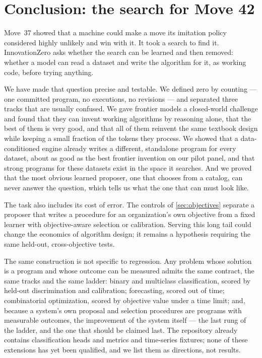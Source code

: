 \section{Conclusion: the search for Move 42}
\label{sec:conclusion}

Move~37 showed that a machine could make a move its imitation policy considered highly unlikely and win with it. It took
a search to find it. InnovationZero asks whether the search can be learned and then removed: whether
a model can read a dataset and write the algorithm for it, as working code, before trying anything.

We have made that question precise and testable. We defined zero by counting --- one committed
program, no executions, no revisions --- and separated three tracks that are usually confused. We gave
frontier models a closed-world challenge and found that they can invent working algorithms by
reasoning alone, that the best of them is very good, and that all of them reinvent the same
textbook design while keeping a small fraction of the tokens they process. We showed that a
data-conditioned engine already writes a different, standalone program for every dataset, about as
good as the best frontier invention on our pilot panel, and that strong programs for these datasets
exist in the space it searches. And we proved that the most obvious learned proposer, one that
chooses from a catalog, can never answer the question, which tells us what the one that can must
look like.

The task also includes its cost of error. The controls of \cref{sec:objectives} separate a
proposer that writes a procedure for an organization's own objective from a fixed learner with
objective-aware selection or calibration. Serving this long tail could change the economics of
algorithm design; it remains a hypothesis requiring the same held-out, cross-objective tests.

The same construction is not specific to regression. Any problem whose solution is a program and
whose outcome can be measured admits the same contract, the same tracks and the same ladder: binary
and multiclass classification, scored by held-out discrimination and calibration; forecasting,
scored out of time; combinatorial optimization, scored by objective value under a time limit; and,
because a system's own proposal and selection procedures are programs with measurable outcomes, the
improvement of the system itself --- the last rung of the ladder, and the one that should be
claimed last. The repository already contains classification heads and metrics and time-series
fixtures; none of these extensions has yet been qualified, and we list them as directions, not
results.


